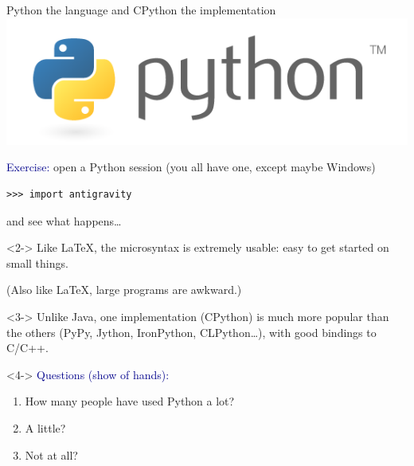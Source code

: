 \documentclass[aspectratio=169]{beamer}
\begin{document}
\begin{frame}[fragile]{Python the language and CPython the implementation}
\vspace{0.5 cm}
\hfill \includegraphics[height=1 cm]{python-logo.png}

\vspace{-1 cm}
\textcolor{darkblue}{Exercise:} open a Python session {\scriptsize (you all have one, except maybe Windows)}

\small
\begin{verbatim}
>>> import antigravity
\end{verbatim}
\normalsize

and see what happens\ldots

\vspace{0.5 cm}
\begin{uncoverenv}<2->
Like \LaTeX, the microsyntax is extremely usable: easy to get started on small things.

(Also like \LaTeX, large programs are awkward.)
\end{uncoverenv}

\vspace{0.5 cm}
\begin{uncoverenv}<3->
Unlike Java, one implementation (CPython) is much more popular than the others (PyPy, Jython, IronPython, CLPython\ldots), with good bindings to C/C++.
\end{uncoverenv}

\vspace{0.5 cm}
\begin{uncoverenv}<4->
\small
\textcolor{darkblue}{Questions (show of hands):}
\vspace{-0.2 cm}
\begin{enumerate}\setlength{\itemsep}{-0.1 cm}
\item How many people have used Python a lot?
\item A little?
\item Not at all?
\end{enumerate}
\end{uncoverenv}
\end{frame}
\end{document}
